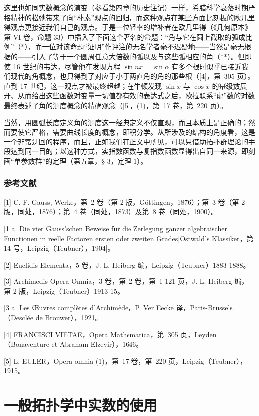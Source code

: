 这里也如同实数概念的演变（参看第四章的历史注记）一样，希腊科学衰落时期严格精神的松弛带来了向“朴素”观点的回归，而这种观点在某些方面比刻板的欧几里得观点更接近我们自己的观点。于是一位轻率的增补者在欧几里得（《几何原本》第 VI 卷，命题 33）中插入了下面这个著名的命题：“角与它在圆上截取的弧成比例”（*），而一位对该命题“证明”作评注的无名学者毫不迟疑地——当然是毫无根据的——引入了等于一个圆周任意大倍数的弧以及与这些弧相应的角（**）。但即使 16 世纪的韦达，尽管他在发现方程 \(\sin nx = \sin \alpha\) 有多个根时似乎已接近我们现代的角概念，也只得到了对应于小于两直角的角的那些根（{[}4{]}，第~305 页）。直到 17 世纪，这一观点才被最终超越；在牛顿发现 \(\sin x\) 与 \(\cos x\) 的幂级数展开、从而给出这些函数对变量一切值都有效的表达式之后，欧拉联系“虚”数的对数最终表述了角的测度概念的精确观念（{[}5{]}，(1)，第~17 卷，第~220 页）。

当然，用圆弧长度定义角的测度这一经典定义不仅直观，而且本质上是正确的；然而要使它严格，需要曲线长度的概念，即积分学。从所涉及的结构的角度看，这是一个非常迂回的程序，而且，正如我们在正文中所见，可以只借助拓扑群理论的手段达到同一目的；以这种方式，实指数函数与复指数函数显得出自同一来源，即刻画“单参数群”的定理（第五章，§ 3，定理 1）。

\subsection*{参考文献}

{[}1{]} C. F. Gauss, Werke，第~2 卷（第 2 版，Göttingen，1876）；第~3 卷（第 2 版，同处，1876）；第~4 卷（同处，1873）及第~8 卷（同处，1900）。

{[}1 a{]} Die vier Gauss'schen Beweise für die Zerlegung ganzer algebraischer Functionen in reelle Factoren ersten oder zweiten Grades{[}Ostwald's Klassiker，第 14 号，Leipzig（Teubner），1904{]}。

{[}2{]} Euclidis Elementa，5 卷，J. L. Heiberg 编，Leipzig（Teubner）1883-1888。

{[}3{]} Archimedis Opera Omnia，3 卷，第~2 卷，第~1-121 页，J. L. Heiberg 编，第 2 版，Leipzig（Teubner）1913-15。

{[}3 a{]} Les Œuvres complètes d'Archimède，P. Ver Eecke 译，Paris-Brussels（Desclée de Brouwer），1921。

{[}4{]} FRANCISCI VIETAE，Opera Mathematica，第~305 页，Leyden（Bonaventure et Abraham Elzevir），1646。

{[}5{]} L. EULER，Opera omnia (1)，第~17 卷，第~220 页，Leipzig（Teubner），1915。

\chapter{一般拓扑学中实数的使用}

